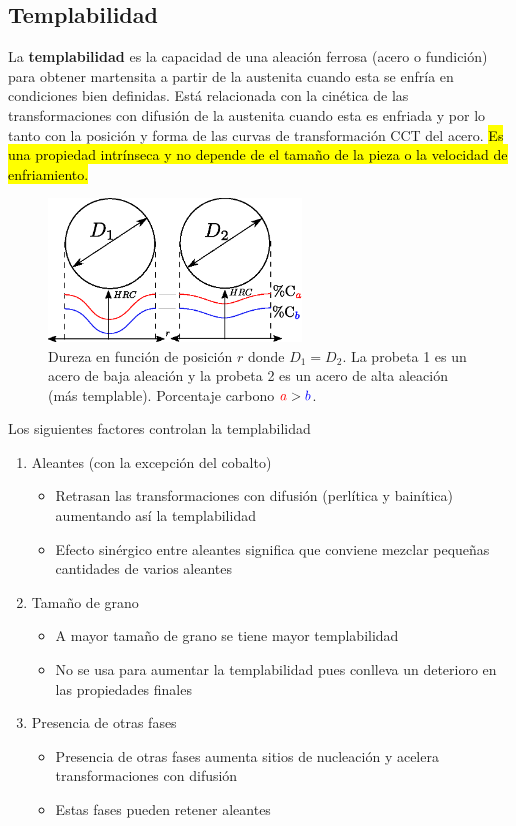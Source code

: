 \subsection{Templabilidad}
La \textbf{templabilidad} es la capacidad de una aleación ferrosa (acero o fundición) para obtener martensita a partir de la austenita cuando esta se enfría en condiciones bien definidas. Está relacionada con la cinética de las transformaciones con difusión de la austenita cuando esta es enfriada y por lo tanto con la posición y forma de las curvas de transformación CCT del acero. \hl{Es una propiedad intrínseca y no depende de el tamaño de la pieza o la velocidad de enfriamiento.}
\begin{figure}[htb!]
    \centering
    \includegraphics[width=0.6\textwidth]{fig/Templabilidad.eps}
    \caption{Dureza en función de posición $r$ donde $D_1 = D_2$. La probeta 1 es un acero de baja aleación y la probeta 2 es un acero de alta aleación (más templable). Porcentaje carbono ${\color{red} a}> {\color{blue} b}$. }
    \label{fig:templabilidad}
\end{figure}
Los siguientes factores controlan la templabilidad
\begin{enumerate}
    \item Aleantes (con la excepción del cobalto)
    \begin{itemize}
        \item Retrasan las transformaciones con difusión (perlítica y bainítica) aumentando así la templabilidad
        \item Efecto sinérgico entre aleantes significa que conviene mezclar pequeñas cantidades de varios aleantes
    \end{itemize}
    \item Tamaño de grano
    \begin{itemize}
        \item A mayor tamaño de grano se tiene mayor templabilidad
        \item No se usa para aumentar la templabilidad pues conlleva un deterioro en las propiedades finales
    \end{itemize}
    \item Presencia de otras fases
    \begin{itemize}
        \item Presencia de otras fases aumenta sitios de nucleación y acelera transformaciones con difusión
        \item Estas fases pueden retener aleantes
    \end{itemize}
\end{enumerate}


